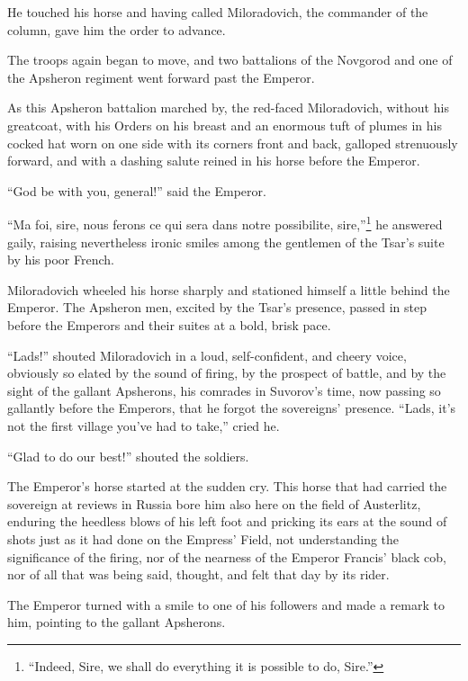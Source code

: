 He touched his horse and having called Miloradovich, the
commander of the column, gave him the order to advance.

The troops again began to move, and two battalions of the
Novgorod and one of the Apsheron regiment went forward past the
Emperor.

As this Apsheron battalion marched by, the red-faced
Miloradovich, without his greatcoat, with his Orders on his
breast and an enormous tuft of plumes in his cocked hat worn on
one side with its corners front and back, galloped strenuously
forward, and with a dashing salute reined in his horse before the
Emperor.

``God be with you, general!'' said the Emperor.

``Ma foi, sire, nous ferons ce qui sera dans notre possibilite,
sire,''\footnote{``Indeed, Sire, we shall do everything it is
possible to do, Sire.''}  he answered gaily, raising nevertheless
ironic smiles among the gentlemen of the Tsar's suite by his poor
French.

Miloradovich wheeled his horse sharply and stationed himself a
little behind the Emperor. The Apsheron men, excited by the
Tsar's presence, passed in step before the Emperors and their
suites at a bold, brisk pace.

``Lads!'' shouted Miloradovich in a loud, self-confident, and
cheery voice, obviously so elated by the sound of firing, by the
prospect of battle, and by the sight of the gallant Apsherons,
his comrades in Suvorov's time, now passing so gallantly before
the Emperors, that he forgot the sovereigns' presence. ``Lads,
it's not the first village you've had to take,'' cried he.

``Glad to do our best!'' shouted the soldiers.

The Emperor's horse started at the sudden cry. This horse that
had carried the sovereign at reviews in Russia bore him also here
on the field of Austerlitz, enduring the heedless blows of his
left foot and pricking its ears at the sound of shots just as it
had done on the Empress' Field, not understanding the
significance of the firing, nor of the nearness of the Emperor
Francis' black cob, nor of all that was being said, thought, and
felt that day by its rider.

The Emperor turned with a smile to one of his followers and made
a remark to him, pointing to the gallant Apsherons.


